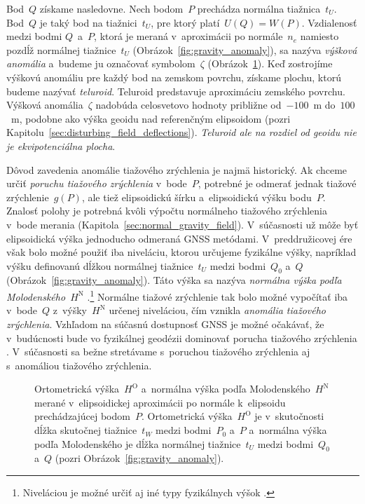 \documentclass[a4paper, 12pt]{book}
\begin{document}
Bod~$Q$ získame nasledovne.  Nech bodom~$P$ prechádza normálna tiažnica~$t_U$.  
Bod~$Q$ je taký bod na tiažnici~$t_U$, pre ktorý platí~$U(Q) = W(P)$.  
Vzdialenosť medzi bodmi $Q$~a~$P$, ktorá je meraná v~aproximácii po 
normále~$n_e$ namiesto pozdĺž normálnej tiažnice~$t_U$ 
(Obrázok~\ref{fig:gravity_anomaly}), sa nazýva \emph{výšková anomália} a~budeme 
ju označovať symbolom~$\zeta$ (Obrázok~\ref{fig:heights}).  Keď zostrojíme 
výškovú anomáliu pre každý bod na zemskom povrchu, získame plochu, ktorú budeme 
nazývať \emph{teluroid}.  Teluroid predstavuje aproximáciu zemského povrchu.  
Výšková anomália~$\zeta$ nadobúda celosvetovo hodnoty približne od~$-100$~m 
do~$100$~m, podobne ako výška geoidu nad referenčným elipsoidom (pozri 
Kapitolu~\ref{sec:disturbing_field_deflections}).  \emph{Teluroid ale na 
rozdiel od geoidu nie je ekvipotenciálna plocha}.

Dôvod zavedenia anomálie tiažového zrýchlenia je najmä historický.  Ak chceme 
určiť \emph{poruchu tiažového zrýchlenia} v~bode~$P$, potrebné je odmerať 
jednak tiažové zrýchlenie~$g(P)$, ale tiež elipsoidickú šírku a~elipsoidickú 
výšku bodu~$P$.  Znalosť polohy je potrebná kvôli výpočtu normálneho tiažového 
zrýchlenia v~bode merania (Kapitola~\ref{sec:normal_gravity_field}).  
V~súčasnosti už môže byť elipsoidická výška jednoducho odmeraná GNSS metódami.  
V~preddružicovej ére však bolo možné použiť iba niveláciu, ktorou určujeme 
fyzikálne výšky, napríklad výšku definovanú dĺžkou normálnej tiažnice~$t_U$ 
medzi bodmi~$Q_0$ a~$Q$ (Obrázok~\ref{fig:gravity_anomaly}).  Táto výška sa 
nazýva \emph{normálna výška podľa Molodenského}~$H^\mathrm{N}$ 
\parencite{MoritzPhysicalGeodesy}.\footnote{Niveláciou je možné určiť aj iné 
typy fyzikálnych výšok \parencite[pozri][]{MoritzPhysicalGeodesy}.}  Normálne 
tiažové zrýchlenie tak bolo možné vypočítať iba v~bode~$Q$ 
z~výšky~$H^\mathrm{N}$ určenej niveláciou, čím vznikla \emph{anomália tiažového 
zrýchlenia}.  Vzhľadom na súčasnú dostupnosť GNSS je možné očakávať, že 
v~budúcnosti bude vo fyzikálnej geodézii dominovať porucha tiažového zrýchlenia 
\parencite{MoritzPhysicalGeodesy}.  V~súčasnosti sa bežne stretávame s~poruchou 
tiažového zrýchlenia aj s~anomáliou tiažového zrýchlenia.

\begin{figure}[bt]
\centering

\caption{Ortometrická výška~$H^\mathrm{O}$ a~normálna výška podľa 
Molodenského~$H^\mathrm{N}$ merané v~elipsoidickej aproximácii po normále 
k~elipsoidu prechádzajúcej bodom~$P$.  Ortometrická výška~$H^\mathrm{O}$ je 
v~skutočnosti dĺžka skutočnej tiažnice~$t_W$ medzi bodmi~$P_0$ a~$P$ a~normálna 
výška podľa Molodenského je dĺžka normálnej tiažnice~$t_U$ medzi bodmi~$Q_0$ 
a~$Q$ (pozri Obrázok~\ref{fig:gravity_anomaly}).}
\label{fig:heights}
\end{figure}
\end{document}
